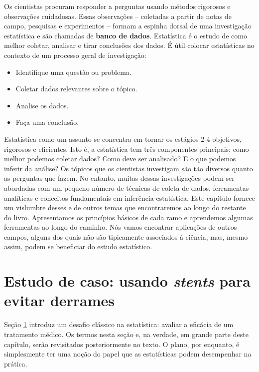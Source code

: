 \documentclass[
]{book}
\theoremstyle{definition}
\theoremstyle{definition}
\theoremstyle{definition}
\theoremstyle{definition}
\theoremstyle{remark}
\begin{document}
Os cientistas procuram responder a perguntas usando métodos rigorosos e observações cuidadosas. Essas observações -- coletadas a partir de notas de campo, pesquisas e experimentos -- formam a espinha dorsal de uma investigação estatística e são chamadas de \textbf{banco de dados}. Estatística é o estudo de como melhor coletar, analisar e tirar conclusões dos dados. É útil colocar estatísticas no contexto de um processo geral de investigação:

\begin{itemize}
\item
  Identifique uma questão ou problema.
\item
  Coletar dados relevantes sobre o tópico.
\item
  Analise os dados.
\item
  Faça uma conclusão.
\end{itemize}

Estatística como um assunto se concentra em tornar os estágios 2-4 objetivos, rigorosos e eficientes. Isto é, a estatística tem três componentes principais: como melhor podemos coletar dados? Como deve ser analisado? E o que podemos inferir da análise?
Os tópicos que os cientistas investigam são tão diversos quanto as perguntas que fazem. No entanto, muitas dessas investigações podem ser abordadas com um pequeno número de técnicas de coleta de dados, ferramentas analíticas e conceitos fundamentais em inferência estatística. Este capítulo fornece um vislumbre desses e de outros temas que encontraremos ao longo do restante do livro. Apresentamos os princípios básicos de cada ramo e aprendemos algumas ferramentas ao longo do caminho. Nós vamos encontrar aplicações de outros campos, alguns dos quais não são tipicamente associados à ciência, mas, mesmo assim, podem se beneficiar do estudo estatístico.

\hypertarget{basicExampleOfStentsAndStrokes}{%
\section{\texorpdfstring{Estudo de caso: usando \emph{stents} para evitar derrames}{Estudo de caso: usando stents para evitar derrames}}\label{basicExampleOfStentsAndStrokes}}

Seção \ref{basicExampleOfStentsAndStrokes} introduz um desafio clássico na estatística: avaliar a eficácia de um tratamento médico. Os termos nesta seção e, na verdade, em grande parte deste capítulo, serão revisitados posteriormente no texto. O plano, por enquanto, é simplesmente ter uma noção do papel que as estatísticas podem desempenhar na prática.
\end{document}
